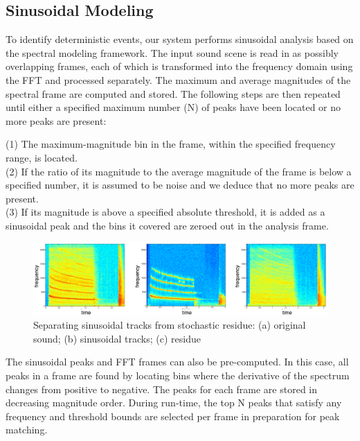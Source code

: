 \documentclass[review]{acmsiggraph}      %
\begin{document}
\subsection{Sinusoidal Modeling}

To identify deterministic events, our system performs sinusoidal analysis based on the 
spectral modeling framework. The input sound scene is read in as possibly overlapping 
frames, each of which is transformed into the frequency domain using the 
FFT and processed separately. The maximum and average 
magnitudes of the spectral frame are computed and stored. The following 
steps are then repeated until either a specified maximum number (N) of peaks 
have been located or no more peaks are present:


(1) The maximum-magnitude bin in the frame, within the specified frequency range, is 
located.\\
(2) If the ratio of its magnitude to the average magnitude of the frame is 
below a specified number, it is assumed to be noise and we deduce that no 
more peaks are present.\\
(3) If its magnitude is above a specified absolute threshold, it is added as a 
sinusoidal peak and the bins it covered are zeroed out in the analysis frame.
\begin{figure}[h]
\setlength\textfloatsep{0pt}
\setlength\abovecaptionskip{0pt}
\setlength\belowcaptionskip{0pt}
\centering
   \includegraphics[width=.48\textwidth]{fireworks3.eps}
\caption{Separating sinusoidal tracks from stochastic residue: (a) original sound; 
(b) sinusoidal tracks; (c) residue}
\label{fig:sines}
\end{figure}

The sinusoidal peaks and FFT frames can also be pre-computed. In this case, all peaks in 
a frame are found by locating bins where the derivative of the spectrum changes from 
positive to negative. The peaks for each frame are stored in decreasing magnitude order.
During run-time, the top N peaks that satisfy any frequency and threshold 
bounds are selected per frame in preparation for peak matching. 
\end{document}
